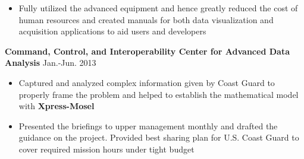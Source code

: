 \documentclass[10.5pt]{res} %
\begin{document}
\begin{resume}
\begin{itemize}
                \item Fully utilized the advanced equipment and hence greatly reduced the cost of human resources and created manuals for both data visualization and acquisition applications to aid users and developers
                \end{itemize}
                \textbf{Command, Control, and Interoperability Center for Advanced Data Analysis}  \hfill Jan.-Jun. 2013
                \begin{itemize}\itemsep -1pt
                \item Captured and analyzed complex information given by Coast Guard to properly frame the problem and helped to establish the mathematical model with \textbf{Xpress-Mosel}%
                \item Presented the briefings to upper management monthly and drafted the guidance on the project. Provided best sharing plan for U.S. Coast Guard to cover required mission hours under tight budget
                \end{itemize}

\end{resume}
\end{document}
